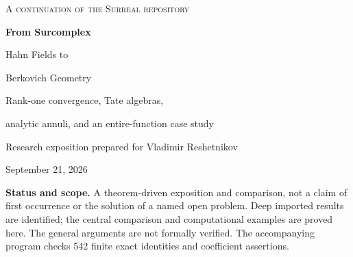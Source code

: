 \documentclass[11pt,a4paper]{article}
\numberwithin{equation}{section}
\theoremstyle{definition}
\theoremstyle{remark}
\newcommand{\No}{\mathbf{No}}
\newcommand{\C}{\mathbb C}
\newcommand{\R}{\mathbb R}
\begin{document}
\hypersetup{pageanchor=false}
\begin{titlepage}
\vspace*{10mm}
{\color{Accent}\large\scshape A continuation of the Surreal repository\par}
\vspace{13mm}
{\color{Ink}\Huge\bfseries From Surcomplex\par Hahn Fields to\par Berkovich Geometry\par}
\vspace{7mm}
{\LARGE Rank-one convergence, Tate algebras,\par analytic annuli, and an entire-function case study\par}
\vspace{10mm}
{\large Research exposition prepared for Vladimir Reshetnikov\par}
{\large September 21, 2026\par}
\vspace{11mm}
\begin{abstract}
The repository develops several support-controlled analytic categories over
surreal and surcomplex numbers, and briefly compares them with Berkovich
geometry. This article fills a different, more concrete gap: it constructs a
rank-one Banach-analytic theory inside the surcomplex field and proves exactly
how it relates to the repository's Hahn-coefficient rings.

Working primarily in $K=\C((t^{\R}))\subset\No[i]$, we distinguish intrinsic
valuation convergence from strong Hahn summability and the full surreal fine
topology. We prove strict comparisons of the function rings, construct one-variable
Weierstrass preparation by a contraction argument, and derive analytic root
counts and a valuation Rouch\'e theorem. We then build the relevant Berkovich
points, explain disks, branches and annulus skeletons, and calculate analytic
de Rham cohomology and residues without pretending that an ultrametric annulus
has an ordinary circular contour.

The case study $F(Z)=\sum_{n\ge0}t^{n^2}Z^n$ has exactly one simple zero of
valuation $-(2m-1)$ for every $m\ge1$, all its zeros are real and negative,
and their first corrections and a convergent canonical product are explicit.
This example also locates the precise boundary between fixed-workspace
entireness and an assertion on the whole proper class $\No[i]$.
\end{abstract}
\vfill
\noindent\colorbox{Pale}{\parbox{\dimexpr\textwidth-2\fboxsep\relax}{\small
\textbf{Status and scope.} A theorem-driven exposition and comparison, not a
claim of first occurrence or the solution of a named open problem. Deep imported
results are identified; the central comparison and computational examples are
proved here. The general arguments are not formally verified. The accompanying
program checks 542 finite exact identities and coefficient assertions.
}}
\end{titlepage}
\hypersetup{pageanchor=true}
\setcounter{tocdepth}{2}
{\small\tableofcontents}
\clearpage
{}
\end{document}
